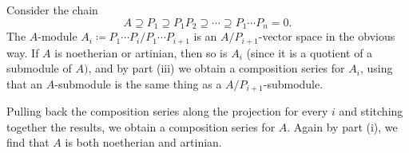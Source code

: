 Consider the chain
\[ A \supseteq P_1 \supseteq P_1P_2 \supseteq \cdots \supseteq P_1\cdots P_n = 0. \]
The $A$-module $A_i\coloneqq P_1\cdots P_i/P_1\cdots P_{i+1}$ is
an $A/P_{i+1}$-vector space in the obvious way.
If $A$ is noetherian or artinian, then so is $A_i$ (since it is a quotient of a submodule
of $A)$, and
by part (iii) we obtain a composition series for $A_i$, using
that an $A$-submodule is the same thing as a $A/P_{i+1}$-submodule.

Pulling back the composition series along the projection for every $i$ and stitching
together the results, we obtain a composition series for $A$. Again by part (i),
we find that $A$ is both noetherian and artinian.
